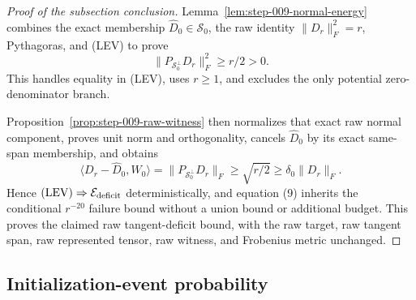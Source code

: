 \begin{proof}[Proof of the subsection conclusion]

Lemma~\ref{lem:step-009-normal-energy} combines the exact membership
\(\widehat D_0\in\mathscr S_0\), the raw identity
\(\|D_r\|_F^2=r\), Pythagoras, and (LEV) to prove
\[
  \|P_{\mathscr S_0^\perp}D_r\|_F^2\ge r/2>0.
\]
This handles equality in (LEV), uses \(r\ge1\), and excludes the only
potential zero-denominator branch.

Proposition~\ref{prop:step-009-raw-witness} then normalizes that exact raw
normal component, proves unit norm and orthogonality, cancels
\(\widehat D_0\) by its exact same-span membership, and obtains
\[
  \langle D_r-\widehat D_0,W_0\rangle
  =\|P_{\mathscr S_0^\perp}D_r\|_F
  \ge\sqrt{r/2}
  \ge\delta_0\|D_r\|_F.
\]
Hence \((\mathrm{LEV})\Rightarrow\mathcal E_{\rm deficit}\) deterministically,
and equation (9) inherits the conditional \(r^{-20}\) failure bound
without a union bound or additional budget. This proves the claimed raw
tangent-deficit bound, with the raw target, raw tangent span, raw represented tensor, raw
witness, and Frobenius metric unchanged.

\end{proof}

\subsection{Initialization-event probability}\label{app:step-010}

